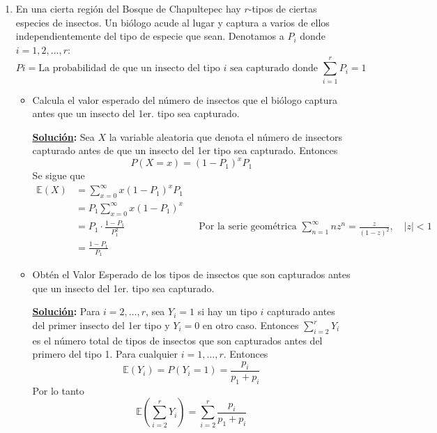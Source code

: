 \documentclass[11pt,letterpaper]{report}
\newcommand{\sol}{\textbf{\underline{Solución}: }} %
\begin{document}
\begin{enumerate}
\begin{itemize}
    \item La probabilidad de que ninguna de las urnas estén vacías
    
    \sol Tenemos que para cada urna tener al menos un bola en ella la tenemos que la $n$-ésima
    bola debe estar en la $n$-ésima urna con probabilidad $\frac{1}{n}$.
    Y así con todas las demás pelotas y urnas con una probabilidad $\frac{1}{n-i}$ con $1 \leq i < n$.
    Entonces las probabilidad de que ninguna de las urnas esté vacía es:
    \[
        \frac{1}{n} \cdot \frac{1}{n-1} \cdot \ldots \cdot \frac{1}{1} = \frac{1}{n!}
    \]
\end{itemize}

\item En una cierta región del Bosque de Chapultepec hay $r$-tipos de ciertas especies de insectos.
Un biólogo acude al lugar y captura a varios de ellos independientemente del tipo de especie que
sean. Denotamos a $P_i$ donde $i = 1,2,\ldots,r$:
\[
    Pi = \text{La probabilidad de que un insecto del tipo $i$ sea capturado donde } \sum_{i=1}^r P_i = 1
\]
\begin{itemize}
    \item Calcula el valor esperado del número de insectos que el biólogo captura antes que un
    insecto del 1er. tipo sea capturado. 

    \sol Sea $X$ la variable aleatoria que denota el número de insectors capturado antes de que un
    insecto del 1er tipo sea capturado. Entonces
    \[
        P(X=x) = (1-P_1)^xP_1
    \]
    Se sigue que
    \begin{align*}
        \mathds{E}(X)
            &= \sum_{x=0}^{\infty} x(1-P_1)^x P_1\\
            &= P_1 \sum_{x=0}^{\infty} x(1-P_1)^x\\
            &= P_1 \cdot \frac{1-P_1}{P_1^2}
                && \text{Por la serie geométrica } \sum_{n=1}^{\infty} nz^n = \frac{z}{(1-z)^2}, \quad |z| < 1\\
            &= \frac{1-P_1}{P_1}
    \end{align*}

    \item Obtén el Valor Esperado de los tipos de insectos que son capturados antes que un insecto
    del 1er. tipo sea capturado.

    \sol Para $i=2,\ldots,r$, sea $Y_i = 1$ si hay un tipo $i$ capturado antes del primer insecto
    del 1er tipo y $Y_i = 0$ en otro caso. Entonces $\sum_{i=2}^{r}Y_i$ es el número total de tipos
    de insectos que son capturados antes del primero del tipo 1. Para cualquier $i = 1,\ldots,r$.
    Entonces
    \[
        \mathds{E}(Y_i) = P(Y_i = 1) = \frac{p_i}{p_1+p_i}
    \]
    Por lo tanto
    \[
        \mathds{E}(\sum_{i=2}^{r} Y_i) = \sum_{i=2}^{r} \frac{p_i}{p_1 + p_i}
    \]

\end{itemize}

\end{enumerate}



\end{document}
